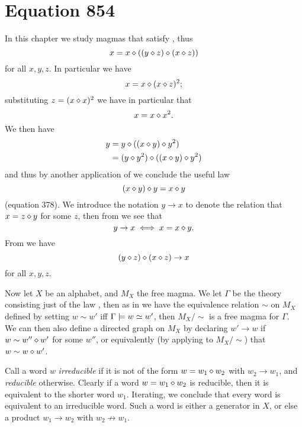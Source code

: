 \chapter{Equation 854}\label{854-chapter}

In this chapter we study magmas that satisfy , thus
\begin{equation}\label{854}
  x = x \diamond ((y \diamond z) \diamond (x \diamond z))
\end{equation}
for all $x,y,z$.  In particular we have
$$ x = x \diamond (x \diamond z)^2;$$
substituting $z  = (x \diamond x)^2$ we have in particular that
\begin{equation}\label{8}
  x = x \diamond x^2.
\end{equation}
We then have
\begin{align*}
  y &= y \diamond ((x \diamond y) \diamond y^2) \\
  & = (y \diamond y^2) \diamond ((x \diamond y) \diamond y^2)
\end{align*}
and thus by another application of  we conclude the useful law
\begin{equation}\label{378}
   (x \diamond y) \diamond y = x \diamond y
\end{equation}
(equation 378).  We introduce the notation $y \to x$ to denote the relation that $x = z \diamond y$ for some $z$, then from  we see that
\begin{equation}\label{yx}
  y \to x \iff x = x \diamond y.
\end{equation}
From  we have
\begin{equation}\label{854-alt}
  (y \diamond z) \diamond (x \diamond z) \to x
\end{equation}
for all $x,y,z$.

Now let $X$ be an alphabet, and $M_X$ the free magma.  We let $\Gamma$ be the theory consisting just of the law , then as in  we have the equivalence relation $\sim$ on $M_X$ defined by setting $w \sim w'$ iff $\Gamma \models w \simeq w'$, then $M_X/\sim$ is a free magma for $\Gamma$.  We can then also define a directed graph on $M_X$ by declaring $w' \to w$ if $w \sim w'' \diamond w'$ for some $w''$, or equivalently (by applying  to $M_X/\sim$) that $w \sim w \diamond w'$.

Call a word $w$ \emph{irreducible} if it is not of the form $w = w_1 \diamond w_2$ with $w_2 \to w_1$, and \emph{reducible} otherwise.  Clearly if a word $w = w_1 \diamond w_2$ is reducible, then it is equivalent to the shorter word $w_1$.  Iterating, we conclude that every word is equivalent to an irreducible word.  Such a word is either a generator in $X$, or else a product $w_1 \to w_2$ with $w_2 \not \to w_1$.

